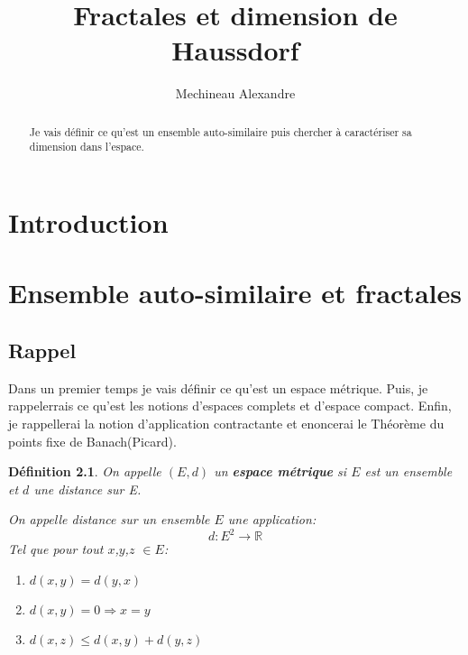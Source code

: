 \documentclass[a4paper, 12pt]{report}
\title{ \bf Fractales et dimension de Haussdorf}
\author{Mechineau Alexandre}
\begin{document}
	\newtheorem{definition}{Définition}
	\newtheorem{prop}{Proposition}
	\newtheorem{theorem}{Théorème}
	\newtheorem*{remark*}{Remarque}
	\newtheorem{lemma}{Lemme}
	
	
	\maketitle
	
	\begin{abstract}
		Je vais définir ce qu'est un ensemble auto-similaire puis chercher à caractériser sa dimension dans l'espace. 
	\end{abstract}
	
	\tableofcontents
	
	\chapter{\bf Introduction}
	
	\chapter{\bf Ensemble auto-similaire et fractales}
		\section{Rappel}
			Dans un premier temps je vais définir ce qu'est un espace métrique. Puis, je rappelerrais ce qu'est les notions d'espaces complets et d'espace compact. Enfin, je rappellerai la notion d'application contractante et enoncerai le Théorème du points fixe de Banach(Picard).
			
			\begin{definition}
				On appelle $(E,d)$ un \textbf{espace métrique} si $E$ est un ensemble et $d$ une distance sur E.
				
				On appelle distance sur un ensemble $E$ une application:
				\begin{equation*}
					d:E^2\longrightarrow \mathds{R}
				\end{equation*}
			Tel que pour tout $x$,$y$,$z$ $\in E$:
				\begin{enumerate}\itemsep2pt
					\item $d(x,y)=d(y,x)$
					\item $d(x,y)=0 \Longrightarrow x=y$
					\item $d(x,z) \leq d(x,y)+d(y,z)$
				\end{enumerate}
			\end{definition}
			
\end{document}
